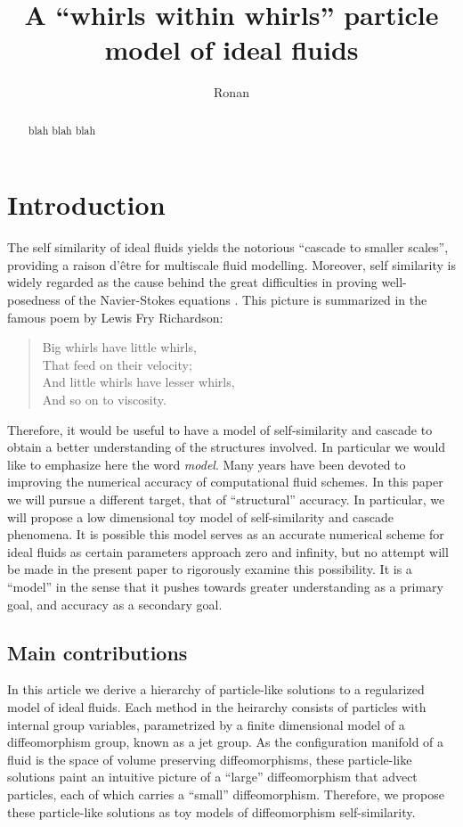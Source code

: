 \documentclass[12pt]{amsart}
\title{A ``whirls within whirls'' particle model of ideal fluids}
\author{Ronan}
\begin{document}
\maketitle

\begin{abstract}
  blah blah blah
\end{abstract}

\section{Introduction}
The self similarity of ideal fluids
yields the notorious ``cascade to smaller scales'',
providing a raison d'\^{e}tre
for multiscale fluid modelling.
Moreover, self similarity is widely regarded as the cause
behind the great difficulties in proving well-posedness of 
the Navier-Stokes equations \cite{KatzPavlovic2005}.
This picture is summarized in the famous poem by Lewis Fry Richardson:
\begin{quote}
  Big whirls have little whirls,\\
  That feed on their velocity;\\
  And little whirls have lesser whirls,\\
  And so on to viscosity.
\end{quote}
Therefore, it would be useful to have a model of self-similarity
and cascade to obtain a better understanding of the structures involved.
In particular we would like to emphasize here the word \emph{model}.
Many years have been devoted to improving the numerical accuracy of computational fluid
schemes.
In this paper we will pursue a different target, that of ``structural'' accuracy.
In particular, we will propose a low dimensional toy model of self-similarity and cascade phenomena.
It is possible this model serves as an accurate numerical scheme for ideal fluids as certain parameters 
approach zero and infinity, but no attempt will be made in the present paper to rigorously examine this 
possibility.
It is a ``model'' in the sense that it pushes towards greater understanding as a primary goal,
and accuracy as a secondary goal.

\subsection{Main contributions}
In this article we derive a hierarchy of particle-like
solutions to a regularized model of ideal fluids.
Each method in the heirarchy consists of particles
with internal group variables, parametrized by
a finite dimensional model of a diffeomorphism group,
known as a jet group.
As the configuration manifold of a fluid is the space of
volume preserving diffeomorphisms, these particle-like solutions
paint an intuitive picture of a ``large'' diffeomorphism that advect particles,
each of which carries a ``small'' diffeomorphism.
Therefore, we propose these particle-like solutions as toy models
of diffeomorphism self-similarity.
\end{document}
